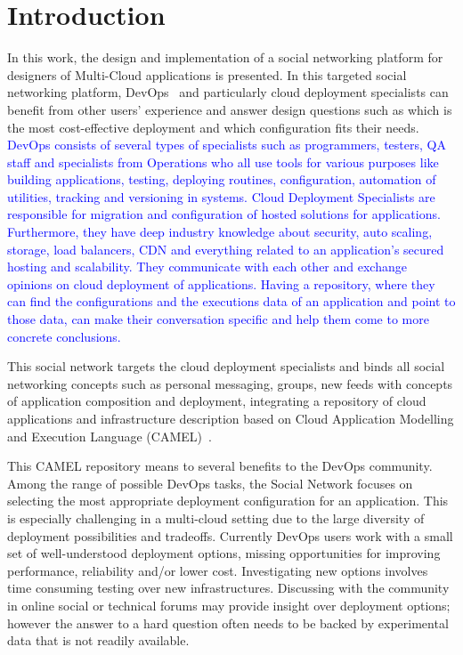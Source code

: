 \chapter{Introduction}
In this work, the design and implementation of a social networking platform for designers of Multi-Cloud applications is presented. In this targeted social networking platform, DevOps~\cite{loukides2012devops} and particularly cloud deployment specialists can benefit from other users' experience and answer design questions such as which is the most cost-effective deployment and which configuration fits their needs. \textcolor{blue}{DevOps consists of several types of specialists such as programmers, testers, QA staff and specialists from Operations who all use tools for various purposes like building applications, testing, deploying routines, configuration, automation of utilities, tracking and versioning in systems.  
Cloud Deployment Specialists are responsible for migration and configuration of hosted solutions for applications. Furthermore, they have deep industry knowledge about security, auto scaling, storage, load balancers, CDN and everything related to an application's secured hosting and scalability. They communicate with each other and exchange opinions on cloud deployment of applications. Having a repository, where they can find the configurations and the executions data of an application and point to those data, can make their conversation specific and help them come to more concrete conclusions.}

This social network targets the cloud deployment specialists and binds all social networking concepts such as personal messaging, groups, new feeds with concepts of application composition and deployment, integrating a repository of cloud applications and infrastructure description based on Cloud Application Modelling and Execution Language (CAMEL)~\cite{paasagedeliverable212}. 

This CAMEL repository means to several benefits to the DevOps community.
Among the range of possible DevOps tasks, the Social Network focuses on selecting the most appropriate deployment
configuration for an application. This is especially challenging in a multi-cloud setting due to the
large diversity of deployment possibilities and tradeoffs. Currently DevOps users work with a small set of
well-understood deployment options, missing opportunities for improving performance, reliability and/or
lower cost. Investigating new options involves time consuming testing over new infrastructures. Discussing
with the community in online social or technical forums may provide insight over deployment options;
however the answer to a hard question often needs to be backed by experimental data that is not readily
available. 

